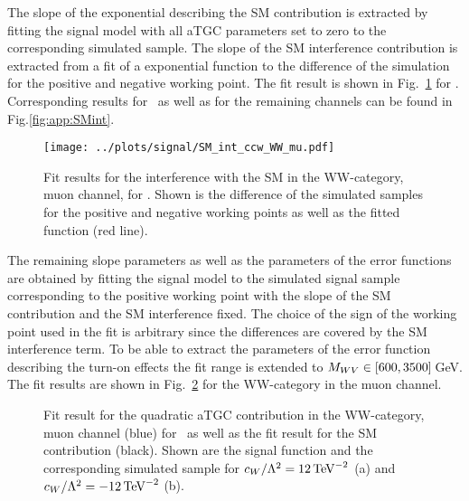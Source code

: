 \noindent The slope of the exponential describing the SM contribution is extracted by fitting the signal model with all aTGC parameters set to zero to the corresponding simulated sample. The slope of the SM interference contribution is extracted from a fit of a exponential function to the difference of the simulation for the positive and negative working point. The fit result is shown in Fig.~\ref{fig:signal:sm_int_WW_mu} for \Tccw. Corresponding results for \Tcb \ as well as for the remaining channels can be found in Fig.\ref{fig:app:SMint}.\\
\begin{figure}
	\centering
		\texttt{[image: ../plots/signal/SM\_int\_ccw\_WW\_mu.pdf]}
	\caption[Fit results for the interference with the SM in the WW-category, muon channel]{Fit results for the interference with the SM in the WW-category, muon channel, for \Tccw . Shown is the difference of the simulated samples for the positive and negative working points as well as the fitted function (red line).}
	\label{fig:signal:sm_int_WW_mu}
\end{figure}

\noindent The remaining slope parameters as well as the parameters of the error functions are obtained by fitting the signal model to the simulated signal sample corresponding to the positive working point with the slope of the SM contribution and the SM interference fixed. The choice of the sign of the working point used in the fit is arbitrary since the differences are covered by the SM interference term. To be able to extract the parameters of the error function describing the turn-on effects the fit range is extended to $M_{WV} \in [600,3500]$\,GeV. The fit results are shown in Fig.~\ref{fig:signal:WW_mu_sig} for the WW-category in the muon channel.

\begin{figure}
	\centering
	\caption[Fit result for the quadratic aTGC contribution in the WW-category, muon channel]{Fit result for the quadratic aTGC contribution in the WW-category, muon channel (blue) for \Tccw \ as well as the fit result for the SM contribution (black). Shown are the signal function and the corresponding simulated sample for $c_{W}/\Lambda^2=12\,{\rm TeV}^{-2}$ (a) and $c_{W}/\Lambda^2=-12\,{\rm TeV}^{-2}$ (b).}
	\label{fig:signal:WW_mu_sig}
\end{figure}


